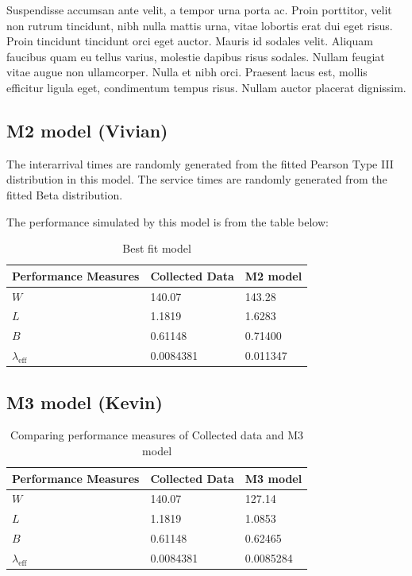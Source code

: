 \documentclass{article}
\begin{document}
Suspendisse accumsan ante velit, a tempor urna porta ac. Proin porttitor, velit non rutrum tincidunt, nibh nulla mattis urna, vitae lobortis erat dui eget risus. Proin tincidunt tincidunt orci eget auctor. Mauris id sodales velit. Aliquam faucibus quam eu tellus varius, molestie dapibus risus sodales. Nullam feugiat vitae augue non ullamcorper. Nulla et nibh orci. Praesent lacus est, mollis efficitur ligula eget, condimentum tempus risus. Nullam auctor placerat dignissim.

\subsection{M2 model (Vivian)}

The interarrival times are randomly generated from the fitted Pearson Type III distribution in this model. The service times are randomly generated from the fitted Beta distribution.

The performance simulated by this model is from the table below:

\begin{table}[H]
    \centering
    \caption{Best fit model}
    \begin{tabu}{*{3}{X[c]}}
        \toprule
        \textbf{Performance Measures} & \textbf{Collected Data} & \textbf{M2 model}\\
        \midrule
        $W$ & 140.07 & 143.28\\
        $L$ & 1.1819 & 1.6283\\
        $B$ & 0.61148 & 0.71400\\
        $\lambda_{\text{eff}}$ & 0.0084381 & 0.011347\\
        \bottomrule
    \end{tabu}
    \label{tab:M2}
\end{table}



\subsection{M3 model (Kevin)}

\begin{table}[h!]
    \centering
    \caption{Comparing performance measures of Collected data and M3 model}
    \begin{tabu}{*{3}{X[c]}}
        \toprule
        \textbf{Performance Measures} & \textbf{Collected Data} & \textbf{M3 model}\\
        \midrule
        $W$ & 140.07 & 127.14\\
        $L$ & 1.1819 & 1.0853\\
        $B$ & 0.61148 & 0.62465\\
        $\lambda_{\text{eff}}$ & 0.0084381 & 0.0085284\\
        \bottomrule
    \end{tabu}
    \label{tab:M3}
\end{table}
\end{document}
